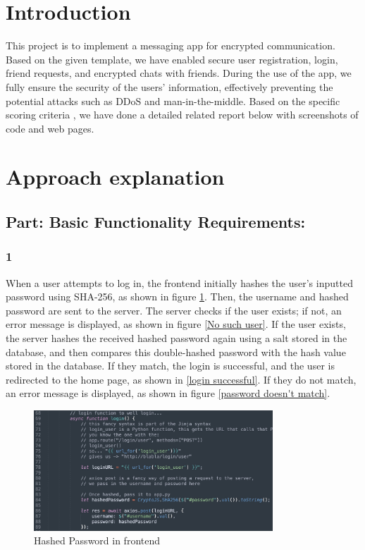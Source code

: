 \documentclass[12pt]{article}
\begin{document}
\section{Introduction}

This project is to implement a messaging app for encrypted communication. Based on the given template, we have enabled secure user registration, login, friend requests, and encrypted chats with friends. During the use of the app, we fully ensure the security of the users' information, effectively preventing the potential attacks such as DDoS and man-in-the-middle. Based on the specific scoring criteria , we have done a detailed related report below with screenshots of code and web pages.

\section{Approach explanation}
    \subsection*{Part: Basic Functionality Requirements:}
        \subsubsection*{1} When a user attempts to log in, the frontend initially hashes the user's inputted password using SHA-256, as shown in figure \ref{Hashed Password in frontend}. Then, the username and hashed password are sent to the server. The server checks if the user exists; if not, an error message is displayed, as shown in figure \ref{No such user}. If the user exists, the server hashes the received hashed password again using a salt stored in the database, and then compares this double-hashed password with the hash value stored in the database. If they match, the login is successful, and the user is redirected to the home page, as shown in \ref{login successful}. If they do not match, an error message is displayed, as shown in figure \ref{password doesn't match}.

        \begin{figure}[H]
            \centering
            \includegraphics[width=0.8\textwidth]{graphs/front_login_hashed.jpg}
            \caption{Hashed Password in frontend}
            \label{Hashed Password in frontend}
        \end{figure}
\end{document}
